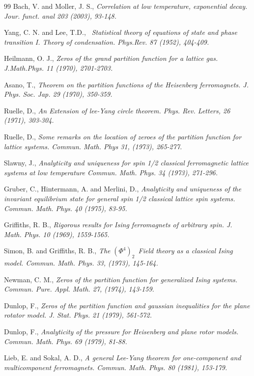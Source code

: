 \documentclass{article}
\begin{document}
\begin{thebibliography}{99}
\bibitem{} Bach, V. and Moller, J. S., \textit{Correlation at low
temperature, exponential decay. Jour. funct. anal 203 (2003), 93-148.}

\bibitem{} Yang, C. N. and Lee, T.D., \textit{\ Statistical theory of
equations of state and phase transition I. Theory of condensation. Phys.Rev.
87 (1952), 404-409.}

\bibitem{} Heilmann, O. J., \textit{Zeros of the grand partition function
for a lattice gas. J.Math.Phys. 11 (1970), 2701-2703.}

\bibitem{} Asano, T., \textit{Theorem on the partition functions of the
Heisenberg ferromagnets. J. Phys. Soc. Jap. 29 (1970), 350-359.}

\bibitem{} Ruelle, D., \textit{An Extension of lee-Yang circle theorem.
Phys. Rev. Letters, 26 (1971), 303-304.}

\bibitem{} Ruelle, D., \textit{Some remarks on the location of zeroes of the
partition function for lattice systems. Commun. Math. Phys 31, (1973),
265-277.}

\bibitem{} Slawny, J., \textit{Analyticity and uniqueness for spin 1/2
classical ferromagnetic lattice systems at low temperature Commun. Math.
Phys. 34 (1973), 271-296.}

\bibitem{} Gruber, C., Hintermann, A. and Merlini, D., \textit{Analyticity
and uniqueness of the invariant equilibrium state for general spin 1/2
classical lattice spin systems. Commun. Math. Phys. 40 (1975), 83-95.}

\bibitem{} Griffiths, R. B., \textit{Rigorous results for Ising ferromagnets
of arbitrary spin. J. Math. Phys. 10 (1969), 1559-1565.}

\bibitem{} Simon, B. and Griffiths, R. B., \textit{The }$\left( \Phi
^{4}\right) _{2}$\textit{\ Field theory as a classical Ising model. Commun.
Math. Phys. 33, (1973), 145-164.}

\bibitem{} Newman, C. M., \textit{Zeros of the partition function for
generalized Ising systems. Commun. Pure. Appl. Math. 27, (1974), 143-159.}

\bibitem{} Dunlop, F., \textit{Zeros of the partition function and gaussian
inequalities for the plane rotator model. J. Stat. Phys. 21 (1979), 561-572.}

\bibitem{} Dunlop, F., \textit{Analyticity of the pressure for Heisenberg
and plane rotor models. Commun. Math. Phys. 69 (1979), 81-88.}

\bibitem{} Lieb, E. and Sokal, A. D., \textit{A general Lee-Yang theorem for
one-component and multicomponent ferromagnets. Commun. Math. Phys. 80
(1981), 153-179.}


\end{thebibliography}
\end{document}
